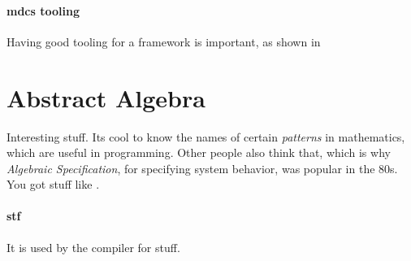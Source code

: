 \paragraph{\gls{mdcs} tooling} Having good tooling for a framework is important,
as shown in \cite{toolMcds}


\section{Abstract Algebra}

Interesting stuff. Its cool to know the names of certain \textit{patterns} in
mathematics, which are useful in programming. Other people also think that,
which is why \textit{Algebraic Specification}, for specifying system behavior,
was popular in the 80s. You got stuff like \cite{cafeObj}.


\paragraph{\gls{stf}} It is used by the compiler \cite{wig} for stuff.
